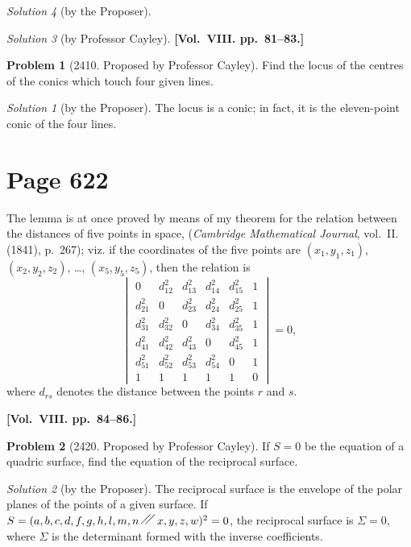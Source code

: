 \documentclass[12pt,a4paper]{article}
\theoremstyle{plain}
\theoremstyle{definition}
\newtheorem{problem}{Problem}
\theoremstyle{remark}
\newtheorem*{solution}{Solution}
\begin{document}
\begin{solution}[by the Proposer]
\begin{solution}[by Professor Cayley]
\medskip\noindent\textbf{[Vol.~VIII. pp.~81--83.]}

\begin{problem}[2410. Proposed by Professor Cayley]
Find the locus of the centres of the conics which touch four given lines.
\end{problem}

\begin{solution}[by the Proposer]
The locus is a conic; in fact, it is the eleven-point conic of the four lines.
\end{solution}

\section*{Page 622}
\setcounter{page}{622}

The lemma is at once proved by means of my theorem for the relation between the distances of five points in space, (\textit{Cambridge Mathematical Journal}, vol.~II. (1841), p.~267); viz. if the coordinates of the five points are $(x_1, y_1, z_1)$, $(x_2, y_2, z_2)$, \ldots, $(x_5, y_5, z_5)$, then the relation is
\[
\begin{vmatrix}
0 & d_{12}^2 & d_{13}^2 & d_{14}^2 & d_{15}^2 & 1 \\
d_{21}^2 & 0 & d_{23}^2 & d_{24}^2 & d_{25}^2 & 1 \\
d_{31}^2 & d_{32}^2 & 0 & d_{34}^2 & d_{35}^2 & 1 \\
d_{41}^2 & d_{42}^2 & d_{43}^2 & 0 & d_{45}^2 & 1 \\
d_{51}^2 & d_{52}^2 & d_{53}^2 & d_{54}^2 & 0 & 1 \\
1 & 1 & 1 & 1 & 1 & 0
\end{vmatrix} = 0,
\]
where $d_{rs}$ denotes the distance between the points $r$ and $s$.

\medskip\noindent\textbf{[Vol.~VIII. pp.~84--86.]}

\begin{problem}[2420. Proposed by Professor Cayley]
If $S = 0$ be the equation of a quadric surface, find the equation of the reciprocal surface.
\end{problem}

\begin{solution}[by the Proposer]
The reciprocal surface is the envelope of the polar planes of the points of a given surface. If $S = (a, b, c, d, f, g, h, l, m, n \,\raisebox{0.5ex}{\ensuremath{\diagup\kern-0.5em\diagup}}\, x, y, z, w)^2 = 0$, the reciprocal surface is $\Sigma = 0$, where $\Sigma$ is the determinant formed with the inverse coefficients.
\end{solution}


\end{solution}
\end{solution}
\end{document}
